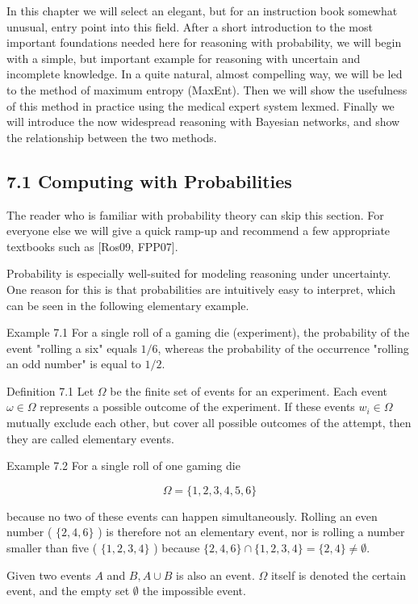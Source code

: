 \documentclass[10pt]{article}
\begin{document}
In this chapter we will select an elegant, but for an instruction book somewhat unusual, entry point into this field. After a short introduction to the most important foundations needed here for reasoning with probability, we will begin with a simple, but important example for reasoning with uncertain and incomplete knowledge. In a quite natural, almost compelling way, we will be led to the method of maximum entropy (MaxEnt). Then we will show the usefulness of this method in practice using the medical expert system lexmed. Finally we will introduce the now widespread reasoning with Bayesian networks, and show the relationship between the two methods.

\subsection*{7.1 Computing with Probabilities}
The reader who is familiar with probability theory can skip this section. For everyone else we will give a quick ramp-up and recommend a few appropriate textbooks such as [Ros09, FPP07].

Probability is especially well-suited for modeling reasoning under uncertainty. One reason for this is that probabilities are intuitively easy to interpret, which can be seen in the following elementary example.

Example 7.1 For a single roll of a gaming die (experiment), the probability of the event "rolling a six" equals $1 / 6$, whereas the probability of the occurrence "rolling an odd number" is equal to $1 / 2$.

Definition 7.1 Let $\Omega$ be the finite set of events for an experiment. Each event $\omega \in \Omega$ represents a possible outcome of the experiment. If these events $w_{i} \in \Omega$ mutually exclude each other, but cover all possible outcomes of the attempt, then they are called elementary events.

Example 7.2 For a single roll of one gaming die

$$
\Omega=\{1,2,3,4,5,6\}
$$

because no two of these events can happen simultaneously. Rolling an even number ( $\{2,4,6\}$ ) is therefore not an elementary event, nor is rolling a number smaller than five ( $\{1,2,3,4\}$ ) because $\{2,4,6\} \cap\{1,2,3,4\}=\{2,4\} \neq \emptyset$.

Given two events $A$ and $B, A \cup B$ is also an event. $\Omega$ itself is denoted the certain event, and the empty set $\emptyset$ the impossible event.
\end{document}
